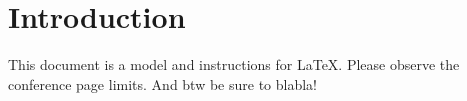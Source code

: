 \section{Introduction}
This document is a model and instructions for \LaTeX.
Please observe the conference page limits. And btw be sure to blabla! 


